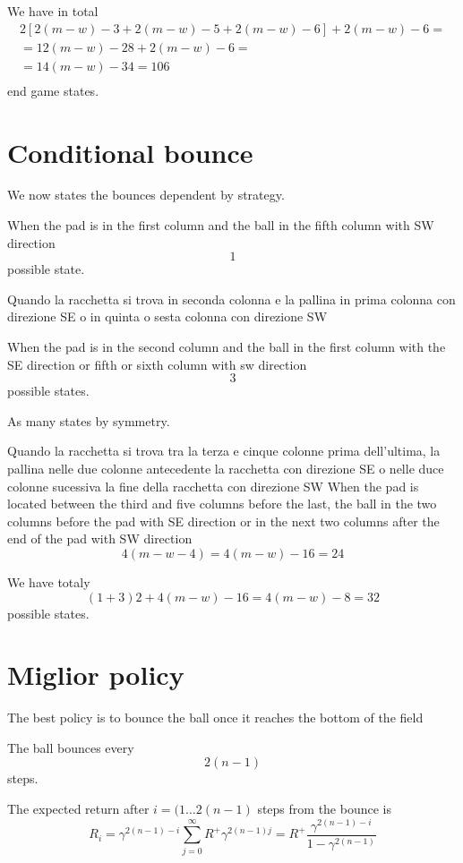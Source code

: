 \documentclass[a4paper,11pt]{article}
\begin{document}
We have in total
\[
\begin{array}{r}
 2[2(m-w)-3+2(m-w)-5+2(m-w)-6]+2(m-w)-6 = \\
 = 12(m-w)-28+2(m-w)-6 = \\
 = 14(m-w)-34 = 106 \\
\end{array}
\]
end game states.


\section{Conditional bounce}

We now states the bounces dependent by strategy.

When the pad is in the first column and the ball in the fifth column with SW direction
\[
1
\]
possible state.

Quando la racchetta si trova in seconda colonna e la pallina in prima colonna con direzione SE o in quinta o sesta colonna con direzione SW

When the pad is in the second column and the ball in the first column with the SE direction or fifth or sixth column with sw direction
\[
3
\]
possible states.

As many states by symmetry.

Quando la racchetta si trova tra la terza e cinque colonne prima dell'ultima, la pallina nelle due colonne antecedente la racchetta
con direzione SE o nelle duce colonne sucessiva la fine della racchetta
con direzione SW
When the pad is located between the third and five columns before the last, the ball in the two columns before the pad with 
SE direction or in the next two columns after the end of the pad
with SW direction
\[
4 (m-w-4)=4(m-w)-16=24
\]

We have totaly 
\[
(1+3)2+4(m-w)-16=4(m-w)-8=32
\]
possible states.


\section{Miglior policy}

The best policy is to bounce the ball once it reaches the bottom of the field

The ball bounces every
\[
2 (n - 1)
\]
steps.

The expected return after $ i = (1 \dots 2(n-1) $ steps from the bounce is 
\[
R_i = \gamma ^ {2(n-1)-i} \sum_{j=0}^{\infty} R^+ \gamma ^ {2(n-1)j} =
R^+ \frac{ \gamma ^ {2(n-1)-i}}{1-\gamma ^ {2(n-1)}}
\]
\end{document}
